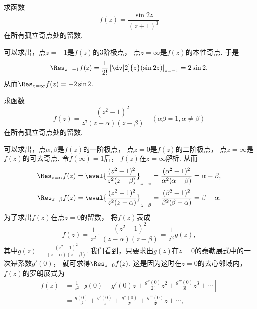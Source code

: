 \begin{example}
求函数\begin{equation*}
	f(z) = \frac{\sin 2z}{(z+1)^3}
\end{equation*}在所有孤立奇点处的留数.
\begin{solution}
可以求出，点\(z=-1\)是\(f(z)\)的3阶极点，
点\(z=\infty\)是\(f(z)\)的本性奇点.
于是\begin{equation*}
	\Res_{z=-1} f(z)
	= \frac{1}{2!} \left[ \dv[2]{z}(\sin 2z) \right]_{z=-1}
	= 2 \sin 2,
\end{equation*}
从而\(\Res_{z=\infty} f(z) = -2 \sin 2\).
\end{solution}
\end{example}

\begin{example}
求函数\begin{equation*}
	f(z) = \frac{(z^2-1)^2}{z^2(z-\alpha)(z-\beta)}
	\quad(\alpha\beta=1, \alpha\neq\beta)
\end{equation*}在所有孤立奇点处的留数.
\begin{solution}
可以求出，点\(\alpha,\beta\)是\(f(z)\)的一阶极点，
点\(z=0\)是\(f(z)\)的二阶极点，
点\(z=\infty\)是\(f(z)\)的可去奇点.
令\(f(\infty)=1\)后，
\(f(z)\)在\(z=\infty\)解析.
从而\begin{equation*}
	\Res_{z=\alpha} f(z)
	= \eval{ \frac{(z^2-1)^2}{z^2(z-\beta)} }_{z=\alpha}
	= \frac{(\alpha^2-1)^2}{\alpha^2(\alpha-\beta)}
	= \alpha-\beta,
\end{equation*}\begin{equation*}
	\Res_{z=\beta} f(z)
	= \eval{ \frac{(z^2-1)^2}{z^2(z-\alpha)} }_{z=\beta}
	= \frac{(\beta^2-1)^2}{\beta^2(\beta-\alpha)}
	= \beta-\alpha.
\end{equation*}
为了求出\(f(z)\)在点\(z=0\)的留数，
将\(f(z)\)表成\begin{equation*}
	f(z) = \frac{1}{z^2} \cdot \frac{(z^2-1)^2}{(z-\alpha)(z-\beta)}
	= \frac{1}{z^2} g(z),
\end{equation*}
其中\(g(z) = \frac{(z^2-1)^2}{(z-\alpha)(z-\beta)}\).
我们看到，只要求出\(g(z)\)在\(z=0\)的泰勒展式中的一次幂系数\(g'(0)\)，
就可求得\(\Res_{z=0} f(z)\).
这是因为这时在\(z=0\)的去心邻域内，
\(f(z)\)的罗朗展式为\begin{align*}
	f(z) &= \frac{1}{z^2}
		\left[
			g(0) + g'(0) z
			+ \frac{g''(0)}{2!} z^2
			+ \frac{g'''(0)}{3!} z^3
			+ \dotsb
		\right] \\
	&= \frac{g(0)}{z^2}
		+ \frac{g'(0)}{z}
		+ \frac{g''(0)}{2!}
		+ \frac{g'''(0)}{3!} z
		+ \dotsb,
\end{align*}

\end{solution}
\end{example}
